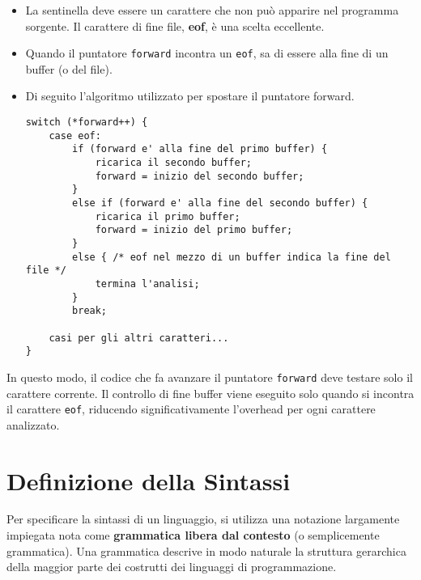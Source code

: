 \documentclass[a4paper, 11pt]{article}
\begin{document}
\begin{itemize}
    \item La sentinella deve essere un carattere che non può apparire nel programma sorgente. Il carattere di fine file, \textbf{eof}, è una scelta eccellente.
    \item Quando il puntatore \texttt{forward} incontra un \texttt{eof}, sa di essere alla fine di un buffer (o del file).

    \item Di seguito l'algoritmo utilizzato per spostare il puntatore forward.
    
    \begin{Verbatim}[frame=single, label=Figura 3.5 - Pseudocodice per la lettura anticipata]
switch (*forward++) {
    case eof:
        if (forward e' alla fine del primo buffer) {
            ricarica il secondo buffer;
            forward = inizio del secondo buffer;
        }
        else if (forward e' alla fine del secondo buffer) {
            ricarica il primo buffer;
            forward = inizio del primo buffer;
        }
        else { /* eof nel mezzo di un buffer indica la fine del file */
            termina l'analisi;
        }
        break;

    casi per gli altri caratteri...
}
\end{Verbatim}
    
\end{itemize}

In questo modo, il codice che fa avanzare il puntatore \texttt{forward} deve testare solo il carattere corrente. Il controllo di fine buffer viene eseguito solo quando si incontra il carattere \texttt{eof}, riducendo significativamente l'overhead per ogni carattere analizzato.

\vspace{1 cm}
\section{Definizione della Sintassi }

Per specificare la sintassi di un linguaggio, si utilizza una notazione largamente impiegata nota come \textbf{grammatica libera dal contesto} (o semplicemente grammatica). Una grammatica descrive in modo naturale la struttura gerarchica della maggior parte dei costrutti dei linguaggi di programmazione.
\end{document}
